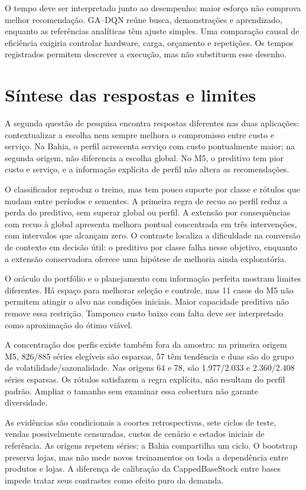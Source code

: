 O tempo deve ser interpretado junto ao desempenho: maior esforço não comprova melhor recomendação. GA--DQN reúne busca, demonstrações e aprendizado, enquanto as referências analíticas têm ajuste simples. Uma comparação causal de eficiência exigiria controlar hardware, carga, orçamento e repetições. Os tempos registrados permitem descrever a execução, mas não substituem esse desenho.


\section{Síntese das respostas e limites}
\label{sec:threats}\label{sec:resultados_m5}
A segunda questão de pesquisa encontra respostas diferentes nas duas aplicações: contextualizar a escolha nem sempre melhora o compromisso entre custo e serviço. Na Bahia, o perfil acrescenta serviço com custo pontualmente maior; na segunda origem, não diferencia a escolha global. No M5, o preditivo tem pior custo e serviço, e a informação explícita de perfil não altera as recomendações.

O classificador reproduz o treino, mas tem pouco suporte por classe e rótulos que mudam entre períodos e sementes. A primeira regra de recuo ao perfil reduz a perda do preditivo, sem superar global ou perfil. A extensão por consequências com recuo à global apresenta melhora pontual concentrada em três intervenções, com intervalos que alcançam zero. O contraste localiza a dificuldade na conversão de contexto em decisão útil: o preditivo por classe falha nesse objetivo, enquanto a extensão conservadora oferece uma hipótese de melhoria ainda exploratória.

O oráculo do portfólio e o planejamento com informação perfeita mostram limites diferentes. Há espaço para melhorar seleção e controle, mas 11 casos do M5 não permitem atingir o alvo nas condições iniciais. Maior capacidade preditiva não remove essa restrição. Tampouco custo baixo com falta deve ser interpretado como aproximação do ótimo viável.

A concentração dos perfis existe também fora da amostra: na primeira origem M5, 826/885 séries elegíveis são esparsas, 57 têm tendência e duas são do grupo de volatilidade/sazonalidade. Nas origens 64 e 78, são 1.977/2.033 e 2.360/2.408 séries esparsas. Os rótulos satisfazem a regra explícita, não resultam do perfil padrão. Ampliar o tamanho sem examinar essa cobertura não garante diversidade.

As evidências são condicionais a coortes retrospectivas, sete ciclos de teste, vendas possivelmente censuradas, custos de cenário e estados iniciais de referência. As origens repetem séries; a Bahia compartilha um ciclo. O bootstrap preserva lojas, mas não mede novos treinamentos ou toda a dependência entre produtos e lojas. A diferença de calibração da CappedBaseStock entre bases impede tratar seus contrastes como efeito puro da demanda.

